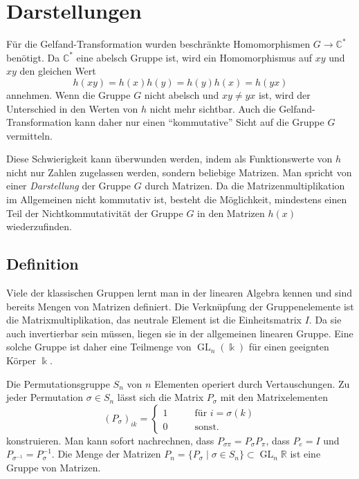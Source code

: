 %
%
%
\section{Darstellungen
\label{buch:gruppen:section:darstellung}}
Für die Gelfand-Transformation wurden beschränkte Homomorphismen
$G\to\mathbb{C}^*$ benötigt.
Da $\mathbb{C}^*$ eine abelsch Gruppe ist, wird ein Homomorphismus
auf $xy$ und $xy$ den gleichen Wert
\[
h(xy) = h(x)h(y) = h(y)h(x) = h(yx)
\]
annehmen.
Wenn die Gruppe $G$ nicht abelsch und $xy\ne yx$ ist, wird der
Unterschied in den Werten von $h$ nicht mehr sichtbar.
Auch die Gelfand-Transformation kann daher nur einen ``kommutative''
Sicht auf die Gruppe $G$ vermitteln.

Diese Schwierigkeit kann überwunden werden, indem als Funktionswerte
von $h$ nicht nur Zahlen zugelassen werden, sondern beliebige
Matrizen.
Man spricht von einer {\em Darstellung} der Gruppe $G$ durch
Matrizen.
Da die Matrizenmultiplikation im Allgemeinen nicht kommutativ
ist, besteht die Möglichkeit, mindestens einen Teil der
Nichtkommutativität der Gruppe $G$ in den Matrizen $h(x)$
wiederzufinden.

%
%
\subsection{Definition}
Viele der klassischen Gruppen lernt man in der linearen Algebra
kennen und sind bereits Mengen von Matrizen definiert.
Die Verknüpfung der Gruppenelemente ist die Matrixmultiplikation,
das neutrale Element ist die Einheitsmatrix $I$.
Da sie auch invertierbar sein müssen, liegen sie in der 
allgemeinen linearen Gruppe.
Eine solche Gruppe ist daher eine Teilmenge von $\operatorname{GL}_n(\Bbbk)$
für einen geeignten Körper $\Bbbk$.

Die Permutationsgruppe $S_n$ von $n$ Elementen operiert durch 
Vertauschungen.
Zu jeder Permutation $\sigma\in S_n$ lässt sich die Matrix $P_\sigma$
mit den Matrixelementen
\[
(P_\sigma)_{ik}
=
\begin{cases}
1&\qquad\text{für $i=\sigma(k)$}\\
0&\qquad\text{sonst}.
\end{cases}
\]
konstruieren.
Man kann sofort nachrechnen, dass $P_{\sigma\pi} = P_\sigma P_\pi$,
dass $P_{e}=I$ und $P_{\sigma^{-1}}=P_\sigma^{-1}$.
Die Menge der Matrizen
$P_n=\{P_\sigma\mid\sigma\in S_n\}\subset\operatorname{GL}_n{\mathbb{R}}$
ist eine Gruppe von Matrizen.

